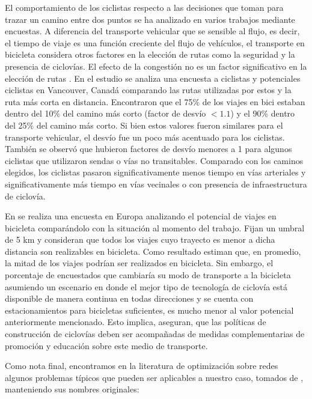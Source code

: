 
  El comportamiento de los ciclistas respecto a las decisiones que toman para trazar un camino entre dos puntos se ha analizado en varios trabajos mediante encuestas. A diferencia del transporte vehicular que se sensible al flujo, es decir, el tiempo de viaje es una función creciente del flujo de vehículos, el transporte en bicicleta considera otros factores en la elección de rutas como la seguridad y la presencia de ciclovías. El efecto de la congestión no es un factor significativo en la elección de rutas \cite{broach2012}. En el estudio \cite{winters2010} se analiza una encuesta a ciclistas y potenciales ciclistas en Vancouver, Canadá comparando las rutas utilizadas por estos y la ruta más corta en distancia. Encontraron que el 75\% de los viajes en bici estaban dentro del 10\% del camino más corto (factor de desvío $< 1.1$) y el 90\% dentro del 25\% del camino más corto. Si bien estos valores fueron similares para el transporte vehicular, el desvío fue un poco más acentuado para los ciclistas. También se observó que hubieron factores de desvío menores a 1 para algunos ciclistas que utilizaron sendas o vías no transitables. Comparado con los caminos elegidos, los ciclistas pasaron significativamente menos tiempo en vías arteriales y significativamente más tiempo en vías vecinales o con presencia de infraestructura de ciclovía.

  En \cite{shwe2014} se realiza una encuesta en Europa analizando el potencial de viajes en bicicleta comparándolo con la situación al momento del trabajo. Fijan un umbral de 5 km y consideran que todos los viajes cuyo trayecto es menor a dicha distancia son realizables en bicicleta. Como resultado estiman que, en promedio, la mitad de los viajes podrían ser realizados en bicicleta. Sin embargo, el porcentaje de encuestados que cambiaría su modo de transporte a la bicicleta asumiendo un escenario en donde el mejor tipo de tecnología de ciclovía está disponible de manera continua en todas direcciones y se cuenta con estacionamientos para bicicletas suficientes, es mucho menor al valor potencial anteriormente mencionado. Esto implica, aseguran, que las políticas de construcción de ciclovías deben ser acompañadas de medidas complementarias de promoción y educación sobre este medio de transporte.


  Como nota final, encontramos en la literatura de optimización sobre redes algunos problemas típicos que pueden ser aplicables a nuestro caso, tomados de \cite{Crainic2021}, manteniendo sus nombres originales:

